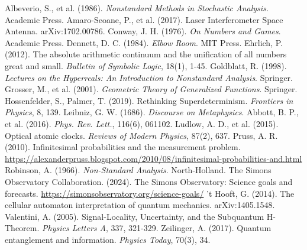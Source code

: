 \documentclass{article}
\begin{document}
\begin{thebibliography}{9}
 Albeverio, S., et al. (1986). \emph{Nonstandard Methods in Stochastic Analysis}. Academic Press.
 Amaro-Seoane, P., et al. (2017). Laser Interferometer Space Antenna. arXiv:1702.00786.
 Conway, J. H. (1976). \emph{On Numbers and Games}. Academic Press.
 Dennett, D. C. (1984). \emph{Elbow Room}. MIT Press.
 Ehrlich, P. (2012). The absolute arithmetic continuum and the unification of all numbers great and small. \emph{Bulletin of Symbolic Logic}, 18(1), 1-45.
 Goldblatt, R. (1998). \emph{Lectures on the Hyperreals: An Introduction to Nonstandard Analysis}. Springer.
 Grosser, M., et al. (2001). \emph{Geometric Theory of Generalized Functions}. Springer.
 Hossenfelder, S., Palmer, T. (2019). Rethinking Superdeterminism. \emph{Frontiers in Physics}, 8, 139.
 Leibniz, G. W. (1686). \emph{Discourse on Metaphysics}.
 Abbott, B. P., et al. (2016). \emph{Phys. Rev. Lett.}, 116(6), 061102.
 Ludlow, A. D., et al. (2015). Optical atomic clocks. \emph{Reviews of Modern Physics}, 87(2), 637.
 Pruss, A. R. (2010). Infinitesimal probabilities and the measurement problem. \url{https://alexanderpruss.blogspot.com/2010/08/infinitesimal-probabilities-and.html}
 Robinson, A. (1966). \emph{Non-Standard Analysis}. North-Holland.
 The Simons Observatory Collaboration. (2024). The Simons Observatory: Science goals and forecasts. \url{https://simonsobservatory.org/science-goals/}
 't Hooft, G. (2014). The cellular automaton interpretation of quantum mechanics. arXiv:1405.1548.
 Valentini, A. (2005). Signal-Locality, Uncertainty, and the Subquantum H-Theorem. \emph{Physics Letters A}, 337, 321-329.
 Zeilinger, A. (2017). Quantum entanglement and information. \emph{Physics Today}, 70(3), 34.
\end{thebibliography}
\end{document}
